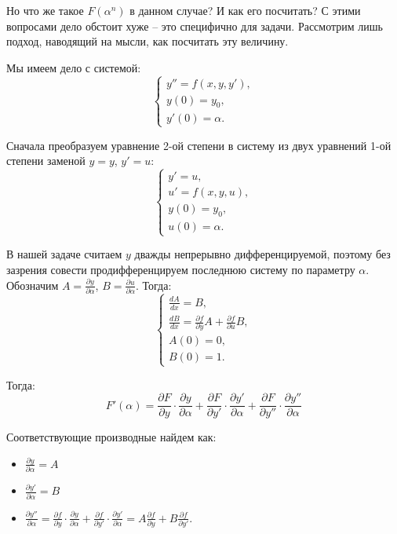 		Но что же такое $F(\alpha^n)$ в данном случае? И как его посчитать? С этими вопросами дело обстоит хуже -- это специфично для задачи. Рассмотрим лишь подход, наводящий на мысли, как посчитать эту величину.
		
		Мы имеем дело с системой:
		\begin{equation*}
			\begin{cases}
				y'' = f(x, y, y'), \\
				y(0) = y_0, \\
				y'(0) = \alpha.
			\end{cases}
		\end{equation*}
	
		Сначала преобразуем уравнение 2-ой степени в систему из двух уравнений 1-ой степени заменой $y = y$, $y' = u$:
		\begin{equation}
			\begin{cases}
				y' = u, \\
				u' = f(x, y, u), \\
				y(0) = y_0, \\
				u(0) = \alpha.
			\end{cases}
		\end{equation}
	
		В нашей задаче считаем $y$ дважды непрерывно дифференцируемой, поэтому без зазрения совести продифференцируем последнюю систему по параметру $\alpha$. Обозначим $A = \frac{\partial y}{\partial \alpha}$, $B = \frac{\partial u}{\partial \alpha}$. Тогда:
		\begin{equation}
			\begin{cases}
				\frac{dA}{dx} = B, \\
				\frac{dB}{dx} = \frac{\partial f}{\partial y} A + \frac{\partial f}{\partial u} B, \\
				A(0) = 0, \\
				B(0) = 1.
			\end{cases}
			\label{AB_SYS}
		\end{equation}
	
		Тогда:
		\begin{equation*}
			F'(\alpha) = \frac{\partial F}{\partial y} \cdot \frac{\partial y}{\partial \alpha} + 
			\frac{\partial F}{\partial y'} \cdot \frac{\partial y'}{\partial \alpha} + 
			\frac{\partial F}{\partial y''} \cdot \frac{\partial y''}{\partial \alpha} 
		\end{equation*}
	
		Соответствующие производные найдем как:
		\begin{itemize}
			\item $\frac{\partial y}{\partial \alpha} = A$
			
			\item $\frac{\partial y'}{\partial \alpha} = B$
			
			\item $\frac{\partial y''}{\partial \alpha} = \frac{\partial f}{\partial y} \cdot \frac{\partial y}{\partial \alpha} + \frac{\partial f}{\partial y'} \cdot \frac{\partial y'}{\partial \alpha} =
		    A\frac{\partial f}{\partial y} + B\frac{\partial f}{\partial y'}$.
		\end{itemize}
	
